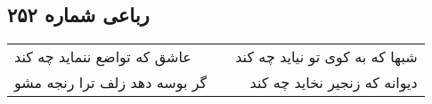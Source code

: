 \begin{center}
\section*{رباعی شماره ۲۵۲}
\label{sec:sh252}
\begin{longtable}{l p{0.5cm} r}
عاشق که تواضع ننماید چه کند
&&
شبها که به کوی تو نیاید چه کند
\\
گر بوسه دهد زلف ترا رنجه مشو
&&
دیوانه که زنجیر نخاید چه کند
\\
\end{longtable}
\end{center}
